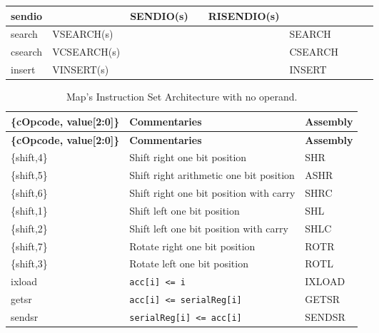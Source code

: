 \begin{table}[H]
\begin{longtable}{|l||l|l|l|l|l|l|l|l|}
sendio    &            & SENDIO(s) &            & RISENDIO(s) &         &          &          &           \\ \hline
search    & VSEARCH(s) &           &            &             & SEARCH  &          &          &           \\ \hline
csearch   & VCSEARCH(s)&           &            &             & CSEARCH &          &          &           \\ \hline
insert    & VINSERT(s) &           &            &             & INSERT  &          &          &           \\ \hline
\end{longtable}
\end{table}


\begin{table}[H]
\small
\centering
\begin{longtable}{|l|l|l|}
\caption{Map's Instruction Set Architecture with no operand.}
\label{tab:map_isa} \\
\hline
\textbf{\{cOpcode, value[2:0]\}} & \textbf{Commentaries} & \textbf{Assembly} \\
\hline
\endfirsthead
\hline
\textbf{\{cOpcode, value[2:0]\}} & \textbf{Commentaries} & \textbf{Assembly} \\
\hline
\endhead
\hline
\endfoot
\hline
\endlastfoot
\{shift,4\}   & Shift right one bit position                     & SHR            \\ \hline
\{shift,5\}   & Shift right arithmetic one bit position          & ASHR           \\ \hline
\{shift,6\}   & Shift right one bit position with carry          & SHRC           \\ \hline
\{shift,1\}   & Shift left one bit position                      & SHL            \\ \hline
\{shift,2\}   & Shift left one bit position with carry           & SHLC           \\ \hline
\{shift,7\}   & Rotate right one bit position                    & ROTR           \\ \hline
\{shift,3\}   & Rotate left one bit position                     & ROTL           \\ \hline
ixload        & \texttt{acc[i] <= i}                             & IXLOAD         \\ \hline
getsr         & \texttt{acc[i] <= serialReg[i]}                  & GETSR          \\ \hline
sendsr        & \texttt{serialReg[i] <= acc[i]}                  & SENDSR         \\ \hline

\end{longtable}
\end{table}
